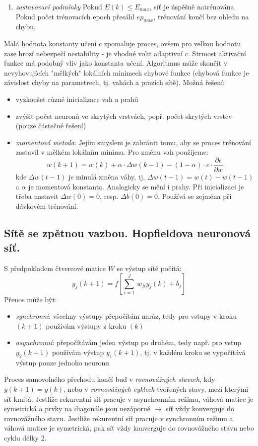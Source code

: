 \begin{enumerate}[label=(\roman*)]
\item \textit{zastavovací podmínky}
Pokud $ E(k) \leq E_{max} $, síť je úspěšně natrénována. Pokud počet trénovacích epoch přesáhl $ ep_{max} $, trénování končí bez ohledu na chybu.
\end{enumerate}
Malá hodnota konstanty učení $ c $ zpomaluje proces, ovšem pro velkou hodnotu zase hrozí nebezpečí nestability - je vhodné volit adaptivní $ c $. Strmost aktivační funkce má podobný vliv jako konstanta učení. Algoritmus může skončit v nevyhovujících "mělkých" lokálních minimech chybové funkce (chybová funkce je závislost chyby na parametrech, tj. vahách a prazích sítě). Možná řešení:
\begin{itemize}
\item vyzkoušet různé inicializace vah a prahů
\item zvýšit počet neuronů ve skrytých vrstvách, popř. počet skrytých vrstev (pouze částečné řešení)
\item \textit{momentová metoda}: Jejím smyslem je zabránit tomu, aby se proces trénování zastavil v mělkém lokálním minimu. Pro změnu vah použijeme:
\begin{equation}
w(k+1) = w(k) + \alpha \cdot \Delta w(k-1) - (1-\alpha) \cdot c \cdot \frac{\partial \epsilon}{\partial w}
\end{equation}
kde $ \Delta w(t-1) $ je minulá změna váhy, tj. $ \Delta w(t-1) = w(t) - w(t-1) $ a $ \alpha $ je momentová konstanta. Analogicky se mění i prahy. Při inicializaci je třeba nastavit $ \Delta w(0) = 0 $, resp. $ \Delta b(0) = 0 $. Používá se zejména při dávkovém trénování.
\end{itemize}

\subsection{Sítě se zpětnou vazbou. Hopfieldova neuronová síť.}
S předpokladem čtvercové matice $ W $ se výstup sítě počítá:
\begin{equation}
y_j(k+1) = f\left[\displaystyle{\sum_{i=1}^J} \, w_{ji} y_j(k) + b_j\right]
\end{equation} 
Přenos může být:
\begin{itemize}
\item \textit{synchronní}: všechny výstupy přepočítám naráz, tedy pro vstupy v kroku $ (k+1) $ používám výstupy z kroku $ (k) $
\item \textit{asynchronní}: přepočítávám jeden výstup po druhém, tedy např. pro vstup $ y_2(k+1) $ používám výstup $ y_1(k+1) $, tj. v každém kroku se vypočítává výstup pouze jednoho neuronu
\end{itemize}
Proces samovolného přechodu končí buď v \textit{rovnovážných stavech}, kdy $ y(k+1) = y(k) $, nebo v \textit{rovnovážných cyklech} tvořených stavy, mezi kterými síť kmitá. Jestliže rekurentní síť pracuje v asynchronním režimu, váhová matice je symetrická a prvky na diagonále jsou nezáporné $ \to $ síť vždy konverguje do rovnovážného stavu. Jestliže rekurentní síť pracuje v synchronním režimu a váhová matice je symetrická, pak síť vždy konverguje do rovnovážného stavu nebo cyklu délky 2.

